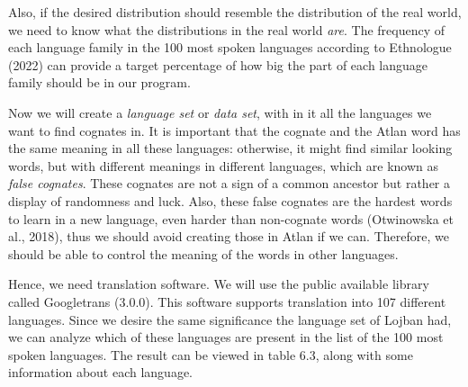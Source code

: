 Also, if the desired distribution should resemble the distribution of the real world, we need to know what the distributions in the real world \textit{are}. The frequency of each language family in the 100 most spoken languages according to Ethnologue (2022) can provide a target percentage of how big the part of each language family should be in our program.  

Now we will create a \textit{language set} or \textit{data set}, with in it all the languages we want to find cognates in. It is important that the cognate and the Atlan word has the same meaning in all these languages: otherwise, it might find similar looking words, but with different meanings in different languages, which are known as \textit{false cognates}. These cognates are not a sign of a common ancestor but rather a display of randomness and luck. Also, these false cognates are the hardest words to learn in a new language, even harder than non-cognate words (Otwinowska et al., 2018), thus we should avoid creating those in Atlan if we can. Therefore, we should be able to control the meaning of the words in other languages. 

Hence, we need translation software. We will use the public available library called Googletrans (3.0.0). This software supports translation into 107 different languages. Since we desire the same significance the language set of Lojban had, we can analyze which of these languages are present in the list of the 100 most spoken languages. The result can be viewed in table 6.3, along with some information about each language.

\setcounter{tablecount}{1}

